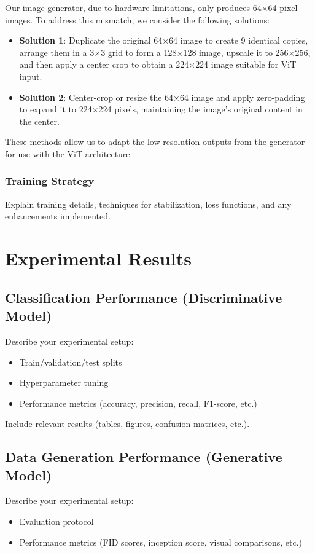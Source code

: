 \documentclass[a4paper,11pt]{article}
\begin{document}
Our image generator, due to hardware limitations, only produces 64$\times$64 pixel images. To address this mismatch, we consider the following solutions:

\begin{itemize}
    \item \textbf{Solution 1}: Duplicate the original 64$\times$64 image to create 9 identical copies, arrange them in a 3$\times$3 grid to form a 128$\times$128 image, upscale it to 256$\times$256, and then apply a center crop to obtain a 224$\times$224 image suitable for ViT input.
    
    \item \textbf{Solution 2}: Center-crop or resize the 64$\times$64 image and apply zero-padding to expand it to 224$\times$224 pixels, maintaining the image's original content in the center.
\end{itemize}

These methods allow us to adapt the low-resolution outputs from the generator for use with the ViT architecture.
\subsubsection{Training Strategy}
Explain training details, techniques for stabilization, loss functions, and any enhancements implemented.

\section{Experimental Results}

\subsection{Classification Performance (Discriminative Model)}
Describe your experimental setup:
\begin{itemize}
    \item Train/validation/test splits
    \item Hyperparameter tuning
    \item Performance metrics (accuracy, precision, recall, F1-score, etc.)
\end{itemize}

Include relevant results (tables, figures, confusion matrices, etc.).

\subsection{Data Generation Performance (Generative Model)}
Describe your experimental setup:
\begin{itemize}
    \item Evaluation protocol
    \item Performance metrics (FID scores, inception score, visual comparisons, etc.)
\end{itemize}
\end{document}
